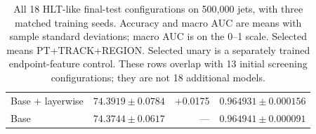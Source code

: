 \begin{table}[htbp]
\begin{tabularx}{\linewidth}{@{}Xrrr@{}}
Base + layerwise & $74.3919 \pm 0.0784$ & +0.0175 & $0.964931 \pm 0.000156$ \\ %
Base & $74.3744 \pm 0.0617$ & --- & $0.964941 \pm 0.000091$ \\ %
\bottomrule
\end{tabularx}
\caption{All 18 HLT-like final-test configurations on 500,000 jets, with three
matched training seeds. Accuracy and macro AUC are means with sample standard
deviations; macro AUC is on the 0--1 scale. Selected means PT+TRACK+REGION.
Selected unary is a separately trained endpoint-feature control.
These rows overlap with 13 initial screening configurations; they are
not 18 additional models.}
\label{tab:hlt-complete-results}
\end{table}
